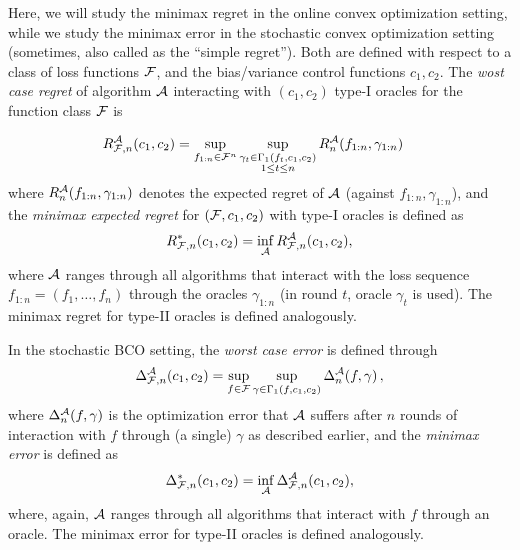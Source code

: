 Here, we will study the minimax regret in the online convex optimization setting, 
 while we study the minimax error in the stochastic convex optimization setting (sometimes, also called as the ``simple regret'').
Both are defined with respect to a class of loss functions $\mathcal{F}$, and the bias/variance control functions $c_1,c_2$.
The \emph{wost case regret} of algorithm $\mathcal{A}$ interacting with $(c_1,c_2)$ type-I oracles for the function class $\mathcal{F}$ is

\begin{align*}
R_{\mathcal{F},n}^{\mathcal{A}}(c_1,c_2)
&=  \sup_{f_{1:n}\in \mathcal{F}^n}
	\sup_{\substack{\gamma_t \in \Gamma_1(f_t,c_1,c_2)\\1\le t \le n
	}} R_n^{\mathcal{A}}(f_{1:n},\gamma_{1:n})
\end{align*}
where $R_n^{\mathcal{A}}(f_{1:n},\gamma_{1:n})$ denotes the expected regret of $\mathcal{A}$ (against $f_{1:n},\gamma_{1:n}$), and
the \emph{minimax expected regret} for $(\mathcal{F},c_1,c_2)$ with type-I oracles is defined as
\[
R_{\mathcal{F},n}^*(c_1,c_2) = \inf_{\mathcal{A}} R_{\mathcal{F},n}^{\mathcal{A}}(c_1,c_2),
\]
where $\mathcal{A}$ ranges through all algorithms that interact with the loss sequence  $f_{1:n}= (f_1,\dots,f_n)$
through the oracles $\gamma_{1:n}$ (in round $t$, oracle $\gamma_t$ is used).
The minimax regret for type-II oracles is defined analogously.


In the stochastic BCO setting, the \emph{worst case error} is defined through
\begin{align}
\label{eq:minimaxerrdef}
\Delta_{\F,n}^\cA(c_1,c_2)
= \sup_{f \in \cF} \sup_{\gamma\in \Gamma_1(f,c_1,c_2)}  \Delta_n^{\cA}(f,\gamma)\,, %
\end{align}
where $\Delta_n^{\mathcal{A}}(f,\gamma)$ is the optimization error that $\mathcal{A}$ suffers
after $n$ rounds of interaction with $f$ through (a single) $\gamma$ as described earlier, and the \emph{minimax error}
is defined as
\[
\Delta_{\mathcal{F},n}^*(c_1,c_2) =  \inf_{\mathcal{A}} \Delta_{\mathcal{F},n}^{\mathcal{A}}(c_1,c_2),
\]
where, again, $\mathcal{A}$ ranges through all algorithms that interact with $f$ through an oracle.
The minimax error for type-II oracles is defined analogously.

